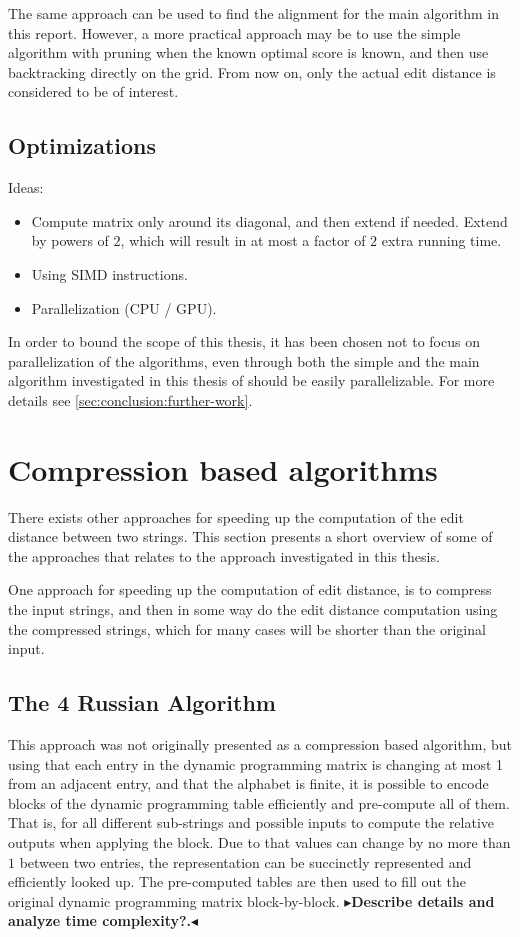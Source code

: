 \documentclass[twoside,11pt,openright]{report}
\newcommand{\todo}[1]{{\color[rgb]{.5,0,0}\textbf{$\blacktriangleright$#1$\blacktriangleleft$}}}
\begin{document}
The same approach can be used to find the alignment for the main algorithm in this report. However, a more practical approach may be to use the simple algorithm with pruning when the known optimal score is known, and then use backtracking directly on the grid. From now on, only the actual edit distance is considered to be of interest.

\subsection{Optimizations}
Ideas:
\begin{itemize}
  \item Compute matrix only around its diagonal, and then extend if needed. Extend by powers of $2$, which will result in at most a factor of $2$ extra running time.
  \item Using SIMD instructions.
  \item Parallelization (CPU / GPU).
\end{itemize}

In order to bound the scope of this thesis, it has been chosen not to focus on parallelization of the algorithms, even through both the simple and the main algorithm investigated in this thesis of \cite{Gawrychowski:2012:FAC:2422024.2422048} should be easily parallelizable. For more details see \ref{sec:conclusion:further-work}.

\section{Compression based algorithms}
There exists other approaches for speeding up the computation of the edit distance between two strings. This section presents a short overview of some of the approaches that relates to the approach investigated in this thesis.

One approach for speeding up the computation of edit distance, is to compress the input strings, and then in some way do the edit distance computation using the compressed strings, which for many cases will be shorter than the original input.

\subsection{The 4 Russian Algorithm}
This approach was not originally presented as a compression based algorithm, but using that each entry in the dynamic programming matrix is changing at most 1 from an adjacent entry, and that the alphabet is finite, it is possible to encode blocks of the dynamic programming table efficiently and pre-compute all of them. That is, for all different sub-strings and possible inputs to compute the relative outputs when applying the block. Due to that values can change by no more than $1$ between two entries, the representation can be succinctly represented and efficiently looked up. The pre-computed tables are then used to fill out the original dynamic programming matrix block-by-block.
\todo{Describe details and analyze time complexity?.}
\end{document}
